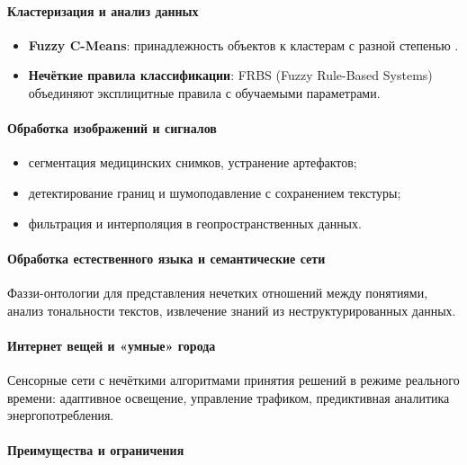 \paragraph{Кластеризация и анализ данных}
\begin{itemize}
  \item \textbf{Fuzzy C-Means}: принадлежность объектов к кластерам с разной степенью \cite{Bezdek1981}.
  \item \textbf{Нечёткие правила классификации}: FRBS (Fuzzy Rule-Based Systems) объединяют эксплицитные правила с обучаемыми параметрами.
\end{itemize}

\paragraph{Обработка изображений и сигналов}
\begin{itemize}
  \item сегментация медицинских снимков, устранение артефактов;
  \item детектирование границ и шумоподавление с сохранением текстуры;
  \item фильтрация и интерполяция в геопространственных данных.
\end{itemize}

\paragraph{Обработка естественного языка и семантические сети}

Фаззи-онтологии для представления нечетких отношений между понятиями, анализ тональности текстов, извлечение знаний из неструктурированных данных.

\paragraph{Интернет вещей и «умные» города}

Сенсорные сети с нечёткими алгоритмами принятия решений в режиме реального времени: адаптивное освещение, управление трафиком, предиктивная аналитика энергопотребления.

\paragraph{Преимущества и ограничения}
\label{subsec:pros_cons}

